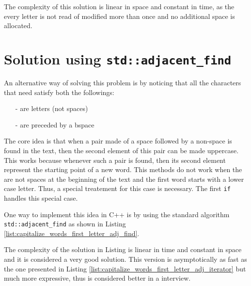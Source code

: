 The complexity of this solution is linear in space and constant in time, as the every letter is not read of modified more than once and no additional space is allocated.

\section{Solution using \texttt{std::adjacent\_find}}

An alternative way of solving this problem is by noticing that all the characters that need satisfy both the followings:
\begin{itemize}
    \item [-] are letters (not spaces)
    \item [-] are preceded by a bspace
\end{itemize}
The core idea is that when a pair made of a space followed by a  non-space is  found in the text, then the second element of this pair can be made uppercase. This works because whenever such a pair is found, then its second element represent the starting point of a new word. This methods do not work when the are not spaces at the beginning of the text and the first word starts with a lower case letter. Thus, a special treatement for this case is necessary. The first \lstinline[columns=fixed]{if} handles this special case.

One way to implement this idea in C++ is by using the standard algorithm \lstinline[columns=fixed]{std::adjacent_find} as shown in Listing \ref{list:capitalize_words_first_letter_adj_find}.




The complexity of the solution in Listing is linear in time and constant in space and it is considered a very good solution. This version is asymptotically as fast  as the one presented in Listing \ref{list:capitalize_words_first_letter_adj_iterator} but much more expressive, thus is considered better in a interview.

